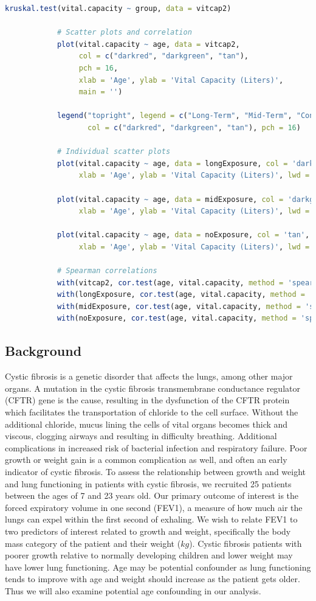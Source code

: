\documentclass{article}
\begin{document}
\begin{lstlisting}[language=R, basicstyle=\footnotesize\ttfamily, breaklines=true]
			kruskal.test(vital.capacity ~ group, data = vitcap2)
			
			# Scatter plots and correlation
			plot(vital.capacity ~ age, data = vitcap2, 
				 col = c("darkred", "darkgreen", "tan"),
				 pch = 16,
				 xlab = 'Age', ylab = 'Vital Capacity (Liters)', 
				 main = '')
			
			legend("topright", legend = c("Long-Term", "Mid-Term", "Control"),
				   col = c("darkred", "darkgreen", "tan"), pch = 16)
			
			# Individual scatter plots
			plot(vital.capacity ~ age, data = longExposure, col = 'darkred',
				 xlab = 'Age', ylab = 'Vital Capacity (Liters)', lwd = 2)
			
			plot(vital.capacity ~ age, data = midExposure, col = 'darkgreen',
				 xlab = 'Age', ylab = 'Vital Capacity (Liters)', lwd = 2)
			
			plot(vital.capacity ~ age, data = noExposure, col = 'tan',
				 xlab = 'Age', ylab = 'Vital Capacity (Liters)', lwd = 2)
			
			# Spearman correlations
			with(vitcap2, cor.test(age, vital.capacity, method = 'spearman' ))
			with(longExposure, cor.test(age, vital.capacity, method = 'spearman' ))
			with(midExposure, cor.test(age, vital.capacity, method = 'spearman' ))
			with(noExposure, cor.test(age, vital.capacity, method = 'spearman' ))
			\end{lstlisting}


		\newpage
		\subsection*{Background}
		
		Cystic fibrosis is a genetic disorder that affects the lungs, among other major organs. A mutation in the cystic fibrosis transmembrane conductance regulator (CFTR) gene is the cause, resulting in the dysfunction of the CFTR protein which facilitates the transportation of chloride to the cell surface. Without the additional chloride, mucus lining the cells of vital organs becomes thick and viscous, clogging airways and resulting in difficulty breathing. Additional complications in increased risk of bacterial infection and respiratory failure. Poor growth or weight gain is a common complication as well, and often an early indicator of cystic fibrosis. To assess the relationship between growth and weight and lung functioning in patients with cystic fibrosis, we recruited 25 patients between the ages of 7 and 23 years old. Our primary outcome of interest is the forced expiratory volume in one second (FEV1), a measure of how much air the lungs can expel within the first second of exhaling. We wish to relate FEV1 to two predictors of interest related to growth and weight, specifically the body mass category of the patient and their weight ($kg$). Cystic fibrosis patients with poorer growth relative to normally developing children and lower weight may have lower lung functioning. Age may be potential confounder as lung functioning tends to improve with age and weight should increase as the patient gets older. Thus we will also examine potential age confounding in our analysis.
\end{document}
